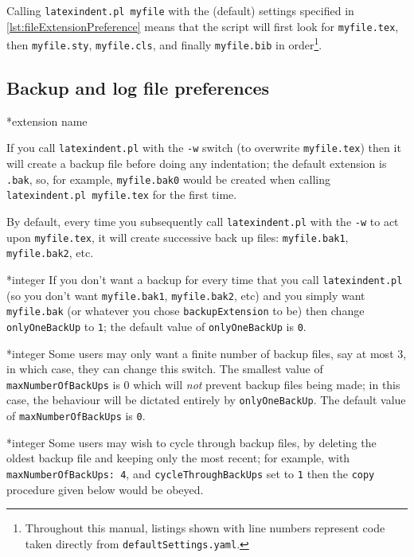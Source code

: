  Calling \texttt{latexindent.pl myfile} with the (default) settings specified in
 \cref{lst:fileExtensionPreference} means that the script will first look for
 \texttt{myfile.tex}, then \texttt{myfile.sty}, \texttt{myfile.cls}, and finally
 \texttt{myfile.bib} in order\footnote{Throughout this manual, listings shown with line
 numbers represent code taken directly from \texttt{defaultSettings.yaml}.}.


\subsection{Backup and log file preferences}
*{extension name}

 If you call \texttt{latexindent.pl} with the \texttt{-w} switch (to overwrite
 \texttt{myfile.tex}) then it will create a backup file before doing any indentation; the
 default extension is \texttt{.bak}, so, for example, \texttt{myfile.bak0} would be
 created when calling \texttt{latexindent.pl myfile.tex} for the first time.

 By default, every time you subsequently call \texttt{latexindent.pl} with the
 \texttt{-w} to act upon \texttt{myfile.tex}, it will create successive back up files:
 \texttt{myfile.bak1}, \texttt{myfile.bak2}, etc.

*{integer}
 \label{page:onlyonebackup}
 If you don't want a backup for every time that you call \texttt{latexindent.pl} (so you
 don't want \texttt{myfile.bak1}, \texttt{myfile.bak2}, etc) and you simply want
 \texttt{myfile.bak} (or whatever you chose \texttt{backupExtension} to be) then change
 \texttt{onlyOneBackUp} to \texttt{1}; the default value of \texttt{onlyOneBackUp} is
 \texttt{0}.

*{integer}
 Some users may only want a finite number of backup files, say at most $3$, in which
 case, they can change this switch. The smallest value of \texttt{maxNumberOfBackUps} is
 $0$ which will \emph{not} prevent backup files being made; in this case, the behaviour
 will be dictated entirely by \texttt{onlyOneBackUp}. The default value of
 \texttt{maxNumberOfBackUps} is \texttt{0}.

*{integer}
 Some users may wish to cycle through backup files, by deleting the oldest backup file and
 keeping only the most recent; for example, with \texttt{maxNumberOfBackUps: 4}, and
 \texttt{cycleThroughBackUps} set to \texttt{1} then the \texttt{copy} procedure given
 below would be obeyed.

